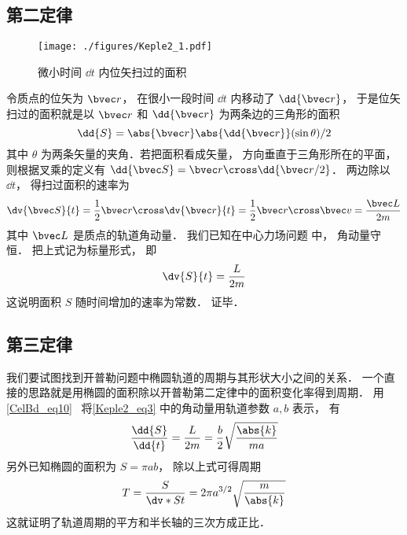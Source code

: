 

\subsection{第二定律}
\begin{figure}[ht]
\centering
\texttt{[image: ./figures/Keple2\_1.pdf]}
\caption{微小时间 $\dd{t}$ 内位矢扫过的面积} \label{Keple2_fig1}
\end{figure}

令质点的位矢为 $\bvec r$，  在很小一段时间 $\dd{t}$ 内移动了 $\dd{\bvec r}$，  于是位矢扫过的面积就是以 $\bvec r$ 和 $\dd{\bvec r}$ 为两条边的三角形的面积
\begin{equation}
\dd{S} = \abs{\bvec r} \abs{\dd{\bvec r}} (\sin \theta) /2
\end{equation}
其中 $\theta$ 为两条矢量的夹角．若把面积看成矢量， 方向垂直于三角形所在的平面， 则根据叉乘的定义有 $\dd{\bvec S} = \bvec r \cross \dd{\bvec r/2}$． 两边除以 $\dd{t}$，  得扫过面积的速率为
\begin{equation}
\dv{\bvec S}{t} = \frac12 \bvec r \cross \dv{\bvec r}{t} = \frac12 \bvec r\cross \bvec v = \frac{\bvec L}{2m}
\end{equation}
其中 $\bvec L$ 是质点的轨道角动量． 我们已知在中心力场问题 中， 角动量守恒． 把上式记为标量形式， 即
\begin{equation}\label{Keple2_eq3}
\dv{S}{t} = \frac{L}{2m}
\end{equation}
这说明面积 $S$ 随时间增加的速率为常数． 证毕．

\subsection{第三定律}
我们要试图找到开普勒问题中椭圆轨道的周期与其形状大小之间的关系． 一个直接的思路就是用椭圆的面积除以开普勒第二定律中的面积变化率得到周期． 用\autoref{CelBd_eq10}~ 将\autoref{Keple2_eq3} 中的角动量用轨道参数 $a,b$ 表示， 有
\begin{equation}
\frac{\dd{S}}{\dd{t}} = \frac{L}{2m} = \frac b2 \sqrt{\frac{\abs{k}}{ma}}
\end{equation}
另外已知椭圆的面积为 $S = \pi ab$， 除以上式可得周期
\begin{equation}\label{Keple2_eq1}
T = \frac{S}{\dv*{S}{t}} = 2\pi a^{3/2} \sqrt{\frac{m}{\abs{k}}}
\end{equation}
这就证明了轨道周期的平方和半长轴的三次方成正比．